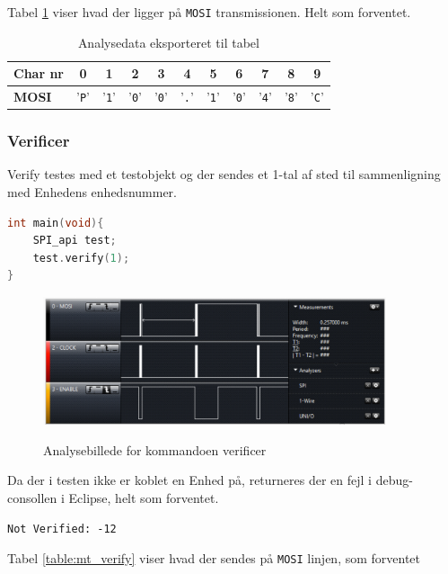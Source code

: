 Tabel \ref{table:mt_config} viser hvad der ligger på \verb+MOSI+ transmissionen. Helt som forventet.

\begin{table}[H]
	\caption{Analysedata eksporteret til tabel}
	\centering
	\begin{tabular}{|l|c|c|c|c|c|c|c|c|c|c|}
		\hline 
		\textbf{Char nr} & \textbf{0} & \textbf{1} & \textbf{2} & \textbf{3} & \textbf{4} & \textbf{5} 
						 & \textbf{6} & \textbf{7} & \textbf{8} & \textbf{9}\\ 		
		\hline 
		\textbf{MOSI} & '\verb+P+' & '\verb+1+' & '\verb+0+' & '\verb+0+' & '\verb+.+' & '\verb+1+' 
						& '\verb+0+' & '\verb+4+' & '\verb+8+' & '\verb+C+' \\ 
		\hline 
	\end{tabular} 
	\label{table:mt_config}
\end{table}


\subsubsection*{Verificer}
Verify testes med et testobjekt og der sendes et 1-tal af sted til sammenligning med Enhedens enhedsnummer.

\begin{lstlisting}[language=C]
int main(void){
	SPI_api test;	
	test.verify(1);
}
\end{lstlisting}

\begin{figure}[H]
\centering
{\includegraphics[width=0.90\textwidth]{filer/modultest/Billeder/mt_verify}}
\caption{Analysebillede for kommandoen verificer}
\label{lab:mt_verify}
\end{figure}

Da der i testen ikke er koblet en Enhed på, returneres der en fejl i debug-consollen i Eclipse, helt som forventet.

\verb+Not Verified: -12+

Tabel \ref{table:mt_verify} viser hvad der sendes på \verb+MOSI+ linjen, som forventet

